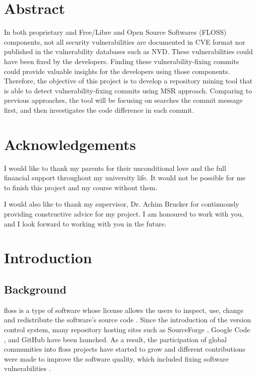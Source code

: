 \documentclass[12pt, a4paper]{report}
\begin{document}
\newpage

\chapter*{Abstract}
In both proprietary and Free/Libre and Open Source Softwares (FLOSS) components, not all security
vulnerabilities are documented in CVE format nor published in the vulnerability databases such as
NVD. These vulnerabilities could have been fixed by the developers. Finding these
vulnerability-fixing commits could provide valuable insights for the developers using those
components. Therefore, the objective of this project is to develop a repository mining tool that is
able to detect vulnerability-fixing commits using MSR approach. Comparing to previous approaches,
the tool will be focusing on searches the commit message first, and then investigates the code
difference in each commit.

\chapter*{Acknowledgements}
I would like to thank my parents for their unconditional love and the full financial support
throughout my university life. It would not be possible for me to finish this project and my course
without them.

I would also like to thank my supervisor, Dr. Achim Brucker for continuously providing constructive
advice for my project. I am honoured to work with you, and I look forward to working with you in the
future.

\newpage

\tableofcontents

\listoffigures

\listoftables

\newpage


\chapter{Introduction}
\section{Background}
\acrfull{floss} is a type of software whose license allows the users to inspect, use, change and
redistribute the software's source code \cite{crowston_2012}. Since the introduction of the version
control system, many repository hosting sites such as SourceForge \cite{sourceforge}, Google Code
\cite{google_code}, and GitHub \cite{github} have been launched. As a result, the participation of
global communities into \acrshort{floss} projects have started to grow and different contributions
were made to improve the software quality, which included fixing software vulnerabilities
\cite{dabbish_2012}.
\end{document}

